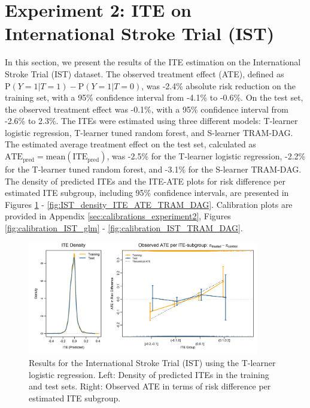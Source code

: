 \clearpage


\section{Experiment 2: ITE on International Stroke Trial (IST)} \label{sec:results_experiment2}


In this section, we present the results of the ITE estimation on the International Stroke Trial (IST) dataset. The observed treatment effect (ATE), defined as $\text{P}(Y=1|T=1) - \text{P}(Y=1|T=0)$, was -2.4\% absolute risk reduction on the training set, with a 95\% confidence interval from -4.1\% to -0.6\%. On the test set, the observed treatment effect was -0.1\%, with a 95\% confidence interval from -2.6\% to 2.3\%. The ITEs were estimated using three different models: T-learner logistic regression, T-learner tuned random forest, and S-learner TRAM-DAG. The estimated average treatment effect on the test set, calculated as $\text{ATE}_\text{pred}=\text{mean}(\text{ITE}_\text{pred})$, was -2.5\% for the T-learner logistic regression, -2.2\% for the T-learner tuned random forest, and -3.1\% for the S-learner TRAM-DAG. The density of predicted ITEs and the ITE-ATE plots for risk difference per estimated ITE subgroup, including 95\% confidence intervals, are presented in Figures \ref{fig:IST_density_ITE_ATE_glm_tlearner} - \ref{fig:IST_density_ITE_ATE_TRAM_DAG}. Calibration plots are provided in Appendix \ref{sec:calibrations_experiment2}, Figures \ref{fig:calibration_IST_glm} - \ref{fig:calibration_IST_TRAM_DAG}. 




\begin{figure}[htbp]
\centering
\includegraphics[width=0.9\textwidth]{img/results_IST/glm_tlearner_density_ITE_ATE.png}
\caption{Results for the International Stroke Trial (IST) using the T-learner logistic regression. Left: Density of predicted ITEs in the training and test sets. Right: Observed ATE in terms of risk difference per estimated ITE subgroup.}
\label{fig:IST_density_ITE_ATE_glm_tlearner}
\end{figure}



